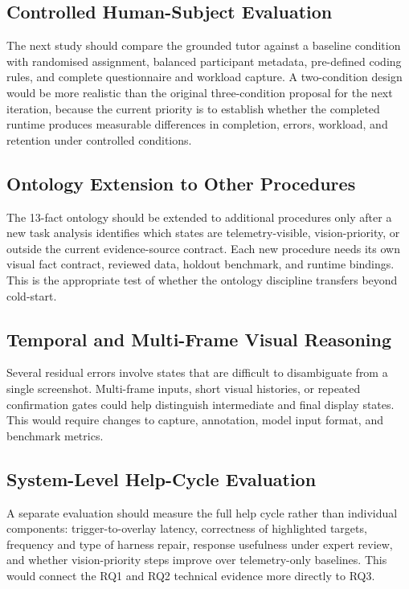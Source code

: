 \subsection{Controlled Human-Subject Evaluation}

The next study should compare the grounded tutor against a baseline condition
with randomised assignment, balanced participant metadata, pre-defined coding
rules, and complete questionnaire and workload capture. A two-condition design
would be more realistic than the original three-condition proposal for the next
iteration, because the current priority is to establish whether the completed
runtime produces measurable differences in completion, errors, workload, and
retention under controlled conditions.

\subsection{Ontology Extension to Other Procedures}

The 13-fact ontology should be extended to additional procedures only after a
new task analysis identifies which states are telemetry-visible,
vision-priority, or outside the current evidence-source contract. Each new
procedure needs its own visual fact contract, reviewed data, holdout benchmark,
and runtime bindings. This is the appropriate test of whether the ontology
discipline transfers beyond cold-start.

\subsection{Temporal and Multi-Frame Visual Reasoning}

Several residual errors involve states that are difficult to disambiguate from a
single screenshot. Multi-frame inputs, short visual histories, or repeated
confirmation gates could help distinguish intermediate and final display states.
This would require changes to capture, annotation, model input format, and
benchmark metrics.

\subsection{System-Level Help-Cycle Evaluation}

A separate evaluation should measure the full help cycle rather than individual
components: trigger-to-overlay latency, correctness of highlighted targets,
frequency and type of harness repair, response usefulness under expert review,
and whether vision-priority steps improve over telemetry-only baselines. This
would connect the RQ1 and RQ2 technical evidence more directly to RQ3.

